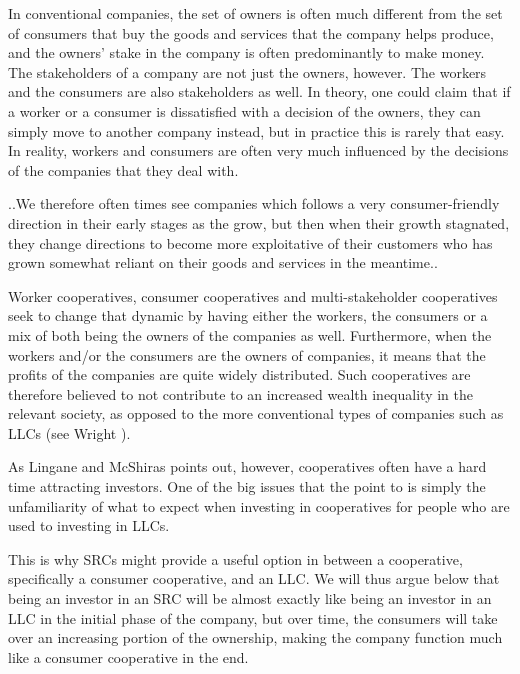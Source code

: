 \documentclass{article}
\begin{document}
In conventional companies, the set of owners is often much different from the set of consumers that buy the goods and services that the company helps produce, and the owners' stake in the company is often predominantly to make money. The stakeholders of a company are not just the owners, however. The workers and the consumers are also stakeholders as well. In theory, one could claim that if a worker or a consumer is dissatisfied with a decision of the owners, they can simply move to another company instead, but in practice this is rarely that easy. In reality, workers and consumers are often very much influenced by the decisions of the companies that they deal with. 

..We therefore often times see companies which follows a very consumer-friendly direction in their early stages as the grow, but then when their growth stagnated, they change directions to become more exploitative of their customers who has grown somewhat reliant on their goods and services in the meantime.. 

Worker cooperatives, consumer cooperatives and multi-stakeholder cooperatives seek to change that dynamic by having either the workers, the consumers or a mix of both being the owners of the companies as well. Furthermore, when the workers and/or the consumers are the owners of companies, it means that the profits of the companies are quite widely distributed. Such cooperatives are therefore believed to not contribute to an increased wealth inequality in the relevant society, as opposed to the more conventional types of companies such as LLCs (see Wright \cite{Wright}). 

As Lingane and McShiras \cite{Lingane and McShiras} %
points out, however, cooperatives often have a hard time attracting investors. %
One of the big issues that the point to is simply the unfamiliarity of what to expect when investing in cooperatives for people who are used to investing in LLCs. 

This is why SRCs might provide a useful option in between a cooperative, specifically a consumer cooperative, and an LLC. We will thus argue below that being an investor in an SRC will be almost exactly like being an investor in an LLC in the initial phase of the company, but over time, the consumers will take over an increasing portion of the ownership, making the company function much like a consumer cooperative in the end. 
\end{document}
